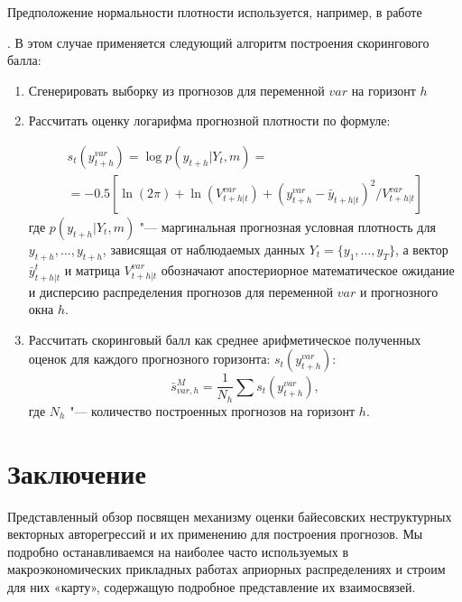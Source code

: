\documentclass[11pt]{article} %
\newcommand{\eng}[1]{\begin{otherlanguage}{english}#1\end{otherlanguage}}
\begin{document}

Предположение нормальности плотности используется, например, в работе \eng{\cite{carriero_al_2015}}. В этом случае применяется следующий алгоритм  построения скорингового балла:

\begin{enumerate}

\item Сгенерировать выборку из прогнозов для переменной $var$ на горизонт $h$

\item Рассчитать оценку логарифма прогнозной плотности по формуле:

\begin{multline}
s_t\left(y_{t+h}^{var}\right) =\log p(y_{t+h}|Y_t,m)=\\
=-0.5\left[ \ln(2\pi)+\ln(V^{var}_{t+h|t})+(y_{t+h}^{var}-\bar y_{t+h|t})^2/V_{t+h|t}^{var} \right]
\end{multline}
где $p(y_{t+h}|Y_t,m)$ "--- маргинальная прогнозная условная плотность для $y_{t+h},\ldots,y_{t+h}$, зависящая от наблюдаемых данных $Y_t=\lbrace{y_1,\ldots,y_T\rbrace}$,  а вектор $\bar y_{t+h|t}^{t}$ и матрица $V_{t+h|t}^{var}$ обозначают апостериорное математическое ожидание и дисперсию  распределения прогнозов для переменной $var$ и прогнозного окна $h$.

\item Рассчитать скоринговый балл как среднее арифметическое полученных оценок для каждого прогнозного горизонта:
$s_t\left(y_{t+h}^{var}\right)$:
\begin{equation}
\bar s_{var,h}^{M}=\frac{1}{N_h}\sum s_t\left(y_{t+h}^{var}\right),
\end{equation}
где $N_h$ "--- количество построенных прогнозов на горизонт $h$.
\end{enumerate}



\section{Заключение}

Представленный обзор посвящен механизму оценки байесовских неструктурных векторных авторегрессий и их применению для построения прогнозов. Мы подробно останавливаемся на наиболее часто используемых в макроэкономических прикладных работах априорных распределениях и строим для них «карту», содержащую подробное представление их взаимосвязей.
\end{document}
